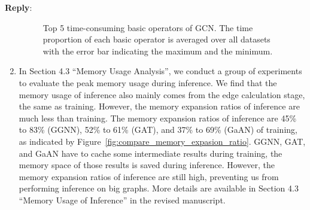 \documentclass[12pt]{article}
\newenvironment{reply}
   {\medskip \noindent \textbf{Reply}:\  }
   {\medskip}
\begin{document}
\begin{reply}
\begin{enumerate}
    \begin{figure}[h]
        \centering
        \caption{Top 5 time-consuming basic operators of GCN. The time proportion of each basic operator is averaged over all datasets with the error bar indicating the maximum and the minimum.}
        \label{fig:compare_top_basic_operators}
    \end{figure}
    
    \item In Section 4.3 ``Memory Usage Analysis'', we conduct a group of experiments to evaluate the peak memory usage during inference.
    We find that the memory usage of inference also mainly comes from the edge calculation stage, the same as training.
    However, the memory expansion ratios of inference are much less than training.
    The memory expansion ratios of inference are 45\% to 83\% (GGNN), 52\% to 61\% (GAT), and 37\% to 69\% (GaAN) of training, as indicated by Figure~\ref{fig:compare_memory_expasion_ratio}.
    GGNN, GAT, and GaAN have to cache some intermediate results during training, the memory space of those results is saved during inference.
    However, the memory expansion ratios of inference are still high, preventing us from performing inference on big graphs.
    More details are available in Section 4.3 ``Memory Usage of Inference'' in the revised manuscript.
    

\end{enumerate}
\end{reply}
\end{document}
